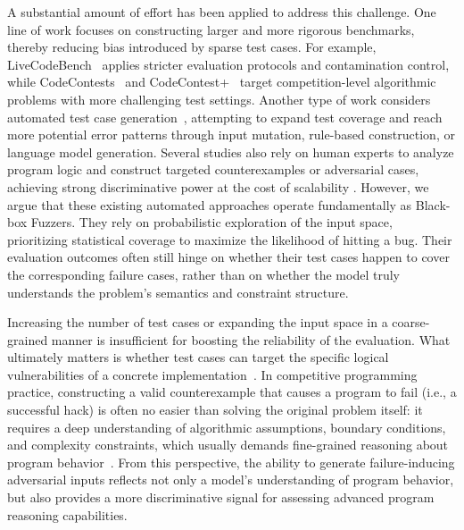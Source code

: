 \documentclass[11pt]{article}
\begin{document}
A substantial amount of effort has been applied to address this challenge. One line of work focuses on constructing larger and more rigorous benchmarks, thereby reducing bias introduced by sparse test cases.
For example,  LiveCodeBench~\cite{livecodebench} applies stricter evaluation protocols and contamination control, while CodeContests~\cite{codecontest} and CodeContest+~\cite{wang2025codecontests+} target competition-level algorithmic problems with more challenging test settings. Another type of work considers automated test case generation~\cite{taco, hardtest, zhou2025autocode}, attempting to expand test coverage and reach more potential error patterns through input mutation, rule-based construction, or language model generation.  Several studies also rely on human experts to analyze program logic and construct targeted counterexamples or adversarial cases, achieving strong discriminative power at the cost of scalability \citep{tcgbench,wang2025aethercode}. 
However, we argue that these existing automated approaches operate fundamentally as Black-box Fuzzers. 
They rely on probabilistic exploration of the input space, prioritizing statistical coverage to maximize the likelihood of hitting a bug. 
Their evaluation outcomes often still hinge on whether their test cases happen to cover the corresponding failure cases, rather than on whether the model truly understands the problem’s semantics and constraint structure.

Increasing the number of test cases or expanding the input space in a coarse-grained manner is insufficient for boosting the reliability of the evaluation. What ultimately matters is whether test cases can target the specific logical vulnerabilities of a concrete implementation~\citep{li2023taco,hardtest}. In competitive programming practice, constructing a valid counterexample that causes a program to fail (i.e., a successful hack) is often no easier than solving the original problem itself: it requires a deep understanding of algorithmic assumptions, boundary conditions, and complexity constraints, which usually demands fine-grained reasoning about program behavior~\citep{wang2025aethercode}. From this perspective, the ability to generate failure-inducing adversarial inputs reflects not only a model’s understanding of program behavior, but also provides a more discriminative signal for assessing advanced program reasoning capabilities.
\end{document}
